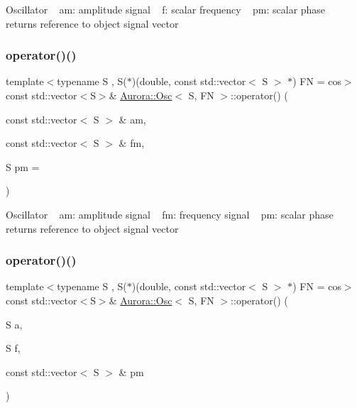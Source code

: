 Oscillator ~\newline
am\+: amplitude signal ~\newline
f\+: scalar frequency ~\newline
pm\+: scalar phase ~\newline
returns reference to object signal vector \mbox{\label{class_aurora_1_1_osc_a7949e8ffffb3a32ca12028e317fcb483}} 
\subsubsection{\texorpdfstring{operator()()}{operator()()}\hspace{0.1cm}{\footnotesize\ttfamily [4/6]}}
{\footnotesize\ttfamily template$<$typename S , S($\ast$)(double, const std\+::vector$<$ S $>$ $\ast$) FN = cos$>$ \\
const std\+::vector$<$S$>$\& \hyperlink{class_aurora_1_1_osc}{Aurora\+::\+Osc}$<$ S, FN $>$\+::operator() (\begin{DoxyParamCaption}\item[{const std\+::vector$<$ S $>$ \&}]{am,  }\item[{const std\+::vector$<$ S $>$ \&}]{fm,  }\item[{S}]{pm = {} }\end{DoxyParamCaption})\hspace{0.3cm}{\ttfamily [inline]}}

Oscillator ~\newline
am\+: amplitude signal ~\newline
fm\+: frequency signal ~\newline
pm\+: scalar phase ~\newline
returns reference to object signal vector \mbox{\label{class_aurora_1_1_osc_abbef8b0aacfbc3cac66f25b774bd3a84}} 
\subsubsection{\texorpdfstring{operator()()}{operator()()}\hspace{0.1cm}{\footnotesize\ttfamily [5/6]}}
{\footnotesize\ttfamily template$<$typename S , S($\ast$)(double, const std\+::vector$<$ S $>$ $\ast$) FN = cos$>$ \\
const std\+::vector$<$S$>$\& \hyperlink{class_aurora_1_1_osc}{Aurora\+::\+Osc}$<$ S, FN $>$\+::operator() (\begin{DoxyParamCaption}\item[{S}]{a,  }\item[{S}]{f,  }\item[{const std\+::vector$<$ S $>$ \&}]{pm }\end{DoxyParamCaption})\hspace{0.3cm}{\ttfamily [inline]}}

